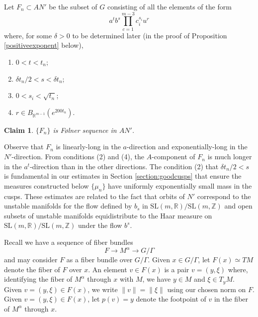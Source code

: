 \documentclass[10pt,reqno]{amsart}
\theoremstyle{Theorem}
\newtheorem{claim}[theorem]{Claim}
\theoremstyle{definition}
\theoremstyle{remark}
\newcommand{\note}[1]{\marginpar{{\color{red}\footnotesize \begin{spacing}{1}#1\end{spacing}}}}
\newcommand{\R}{\mathbb {R}}
\newcommand{\Z}{\mathbb {Z}}
\newcommand{\Sl}{\mathrm{SL}}
\renewcommand\P{\mathbb{P}}
\def\Folner{F{\o}lner }
\begin{document}

Let $F_n\subset AN'$ be the subset of $G$ consisting of all the elements of the form
\begin{equation}\label{folner}
a^tb^{s} \prod_{c=1}^{m-3} c_i^{s_i} u^{r}
\end{equation}
where, for some $\delta>0$   to be determined later (in the proof of Proposition \ref{positiveexponent} below),
\begin{enumerate}
\item $0<t<t_n$;
\item$ \delta t_n/2<s < \delta t_n$;
\item $ 0 < s_i <  \sqrt{t_n}$;
\item $r \in B_{\R^{m-1}} (e^{200t_n})$.
\end{enumerate}

\begin{claim}
$\{F_n\}$ is \Folner sequence in $AN'$.
\end{claim}

Observe that $F_n$ is  linearly-long in the $a$-direction and exponentially-long in the $N'$-direction. From conditions (2) and (4), the $A$-component of $F_n$ is much longer in the $a^t$-direction than in the other directions.
The condition (2) that  $\delta t_n/2<s$ is fundamental in our estimates in Section \ref{section:goodcusps} that ensure the  measures constructed below $\{\mu_n\}$ have uniformly  exponentially small mass in the cusps. These estimates are related to the fact that orbits of $N'$ correspond to the   unstable manifolds for the flow defined by $b_{s}$ in $\Sl(m,\R)/\Sl(m,\Z)$ and open subsets of unstable manifolds equidistribute to the Haar measure on $\Sl(m,\R)/\Sl(m,\Z)$  under the flow $b^{s}$.

Recall we have a sequence of fiber bundles $$F\to M^\alpha\to G/\Gamma$$ %
and may consider $F$  %
as a fiber bundle over $G/\Gamma$.  Given $x\in G/\Gamma$, let $F(x)\simeq TM$ denote the fiber of $F$ over $x$.  An element $v\in F(x)$ is a pair $v= (y,\xi)$ where, identifying the fiber of $M^\alpha$ through $x$ with $M$, we have  $y\in M$ and $\xi\in T_y M$.  Given $v= (y,\xi)\in F(x)$,  we write $\|v\| = \|\xi\|$ using our chosen norm on $F$.  %
Given $v = (y,\xi)\in F(x)$, let $p(v) = y$ denote the footpoint of $v$ in the fiber of $M^\alpha$ through $x$.  %
\end{document}
